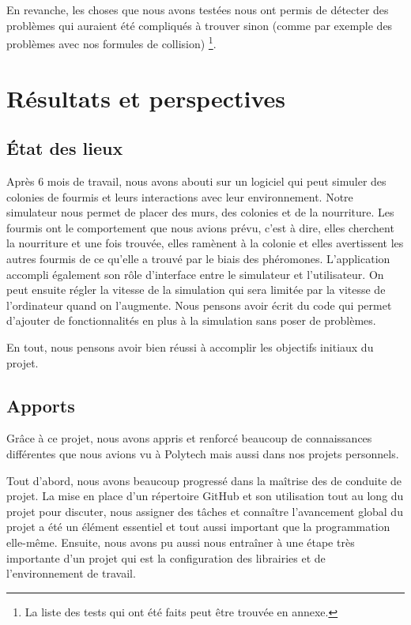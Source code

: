 \documentclass{EPUProjetDi}
\begin{document}
En revanche, les choses que nous avons testées nous ont permis de détecter des problèmes qui auraient été compliqués à trouver sinon (comme par exemple des problèmes avec nos formules de collision)
\footnote{La liste des tests qui ont été faits peut être trouvée en annexe.}.

\chapter{Résultats et perspectives}

\section{État des lieux}

Après 6 mois de travail, nous avons abouti sur un logiciel qui peut simuler des colonies de fourmis et leurs interactions avec leur environnement.
Notre simulateur nous permet de placer des murs, des colonies et de la nourriture. 
Les fourmis ont le comportement que nous avions prévu, c'est à dire, elles cherchent la nourriture et une fois trouvée, elles ramènent à la colonie et elles avertissent les 
autres fourmis de ce qu'elle a trouvé par le biais des phéromones.
L'application accompli également son rôle d'interface entre le simulateur et l'utilisateur. On peut ensuite régler la vitesse de la simulation qui sera limitée par la vitesse de l'ordinateur quand on l'augmente.
Nous pensons avoir écrit du code qui permet d'ajouter de fonctionnalités en plus à la simulation sans poser de problèmes.

En tout, nous pensons avoir bien réussi à accomplir les objectifs initiaux du projet.

\section{Apports}

Grâce à ce projet, nous avons appris et renforcé beaucoup de connaissances différentes que nous avions vu à Polytech mais aussi 
dans nos projets personnels. 

Tout d'abord, nous avons beaucoup progressé dans la maîtrise des de conduite de projet. La mise en place d'un répertoire
GitHub et son utilisation tout au long du projet pour discuter, nous assigner des tâches et connaître l'avancement global du projet a été un élément essentiel
et tout aussi important que la programmation elle-même. Ensuite, nous avons pu aussi nous entraîner à une étape très importante d'un 
projet qui est la configuration des librairies et de l'environnement de travail.
\end{document}
